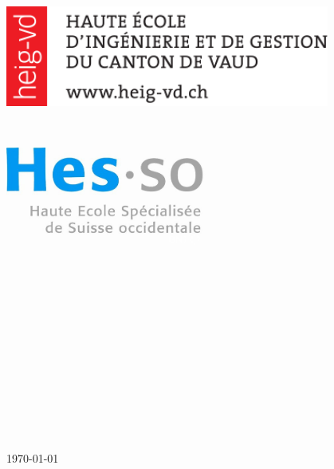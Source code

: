 %
%
%

\begin{titlepage}

\begin{minipage}{0.4\textwidth}
\begin{flushleft}
\includegraphics[width=0.8\textwidth]{pageGarde/logo1}~
\end{flushleft}
\end{minipage} 
~
\begin{minipage}{0.4\textwidth}
\begin{flushright}
\includegraphics[width=0.5\textwidth]{pageGarde/logo2}~
\end{flushright}
\end{minipage}\\[3cm]

\begin{center}

\textsc{\Large\theMatter} \\[0.2cm]
{\large\theAcro} \\[1cm]
\HRule \\[0.5cm]
\textsc{\huge \thetitle} \\[0.3cm]
\HRule \\[1cm]
{\large\theauthor} \\[2cm]
\end{center}

\begin{minipage}{0.4\textwidth}
\begin{flushleft}
\theInstitution
\end{flushleft}
\end{minipage}
~
\begin{minipage}{0.4\textwidth}
\begin{flushright}
\theDest
\end{flushright}
\end{minipage} \\[3cm]

\begin{center}
\today
\vfill
\end{center}

\end{titlepage}
